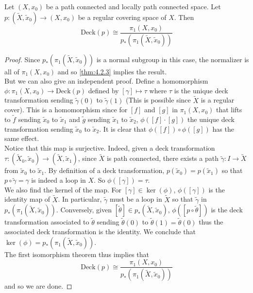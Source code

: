 \documentclass[a4paper]{article}
\begin{document}
\begin{crl}{}{} Let $(X,x_0)$ be a path connected and locally path connected space. Let $p:(\tilde{X},\tilde{x}_0)\to(X,x_0)$ be a regular covering space of $X$. Then $$\text{Deck}(p)\cong\frac{\pi_1(X,x_0)}{p_\ast\left(\pi_1(\tilde{X},\tilde{x}_0)\right)}$$ 
\begin{proof}
Since $p_\ast(\pi_1(\tilde{X},\tilde{x}_0))$ is a normal subgroup in this case, the normalizer is all of $\pi_1(X,x_0)$ and so \ref{thm:4.2.3} implies the result. \\

But we can also give an independent proof. Define a homomorphism $\phi:\pi_1(X,x_0)\to\text{Deck}(p)$ defined by $[\gamma]\mapsto\tau$ where $\tau$ is the unique deck transformation sending $\tilde{\gamma}(0)$ to $\tilde{\gamma}(1)$ (This is possible since $\tilde{X}$ is a regular cover). This is a homomorphism since for $[f]$ and $[g]$ in $\pi_1(X,x_0)$ that lifts to $\tilde{f}$ sending $\tilde{x}_0$ to $\tilde{x}_1$ and $\tilde{g}$ sending $\tilde{x}_1$ to $\tilde{x}_2$, $\phi([f]\cdot[g])$ the unique deck transformation sending $\tilde{x}_0$ to $\tilde{x}_2$. It is clear that $\phi([f])\circ\phi([g])$ has the same effect. \\

Notice that this map is surjective. Indeed, given a deck transformation $\tau:(\tilde{X}_0,\tilde{x}_0)\to(\tilde{X},\tilde{x}_1)$, since $\tilde{X}$ is path connected, there exists a path $\tilde{\gamma}:I\to\tilde{X}$ from $\tilde{x}_0$ to $\tilde{x}_1$. By definition of a deck transformation, $p(\tilde{x}_0)=p(\tilde{x}_1)$ so that $p\circ\tilde{\gamma}=\gamma$ is indeed a loop in $X$. So $\phi([\gamma])=\tau$. \\

We also find the kernel of the map. For $[\gamma]\in\ker(\phi)$, $\phi([\gamma])$ is the identity map of $\tilde{X}$. In particular, $\tilde{\gamma}$ must be a loop in $\tilde{X}$ so that $\tilde{\gamma}$ in $p_\ast(\pi_1(\tilde{X},\tilde{x}_0))$. Conversely, given $[\tilde{\theta}]\in p_\ast(\tilde{X},\tilde{x}_0)$, $\phi([p\circ\tilde{\theta}])$ is the deck transformation associated to $\tilde{\theta}$ sending $\tilde{\theta}(0)$ to $\tilde{\theta}(1)=\tilde{\theta}(0)$ thus the associated deck transformation is the identity. We conclude that $\ker(\phi)=p_\ast(\pi_1(\tilde{X},\tilde{x}_0))$. \\

The first isomorphism theorem thus implies that $$\text{Deck}(p)\cong\frac{\pi_1(X,x_0)}{p_\ast\left(\pi_1(\tilde{X},\tilde{x}_0)\right)}$$ and so we are done. 
\end{proof}
\end{crl}
\end{document}
